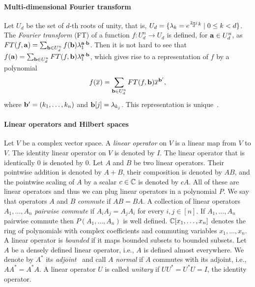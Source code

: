\paragraph{Multi-dimensional Fourier transform}\label{sec:multi-FT}

Let $U_d$ be the set of $d$-th roots of unity, that is,
$U_d=\{\lambda_k=e^{\frac{2\pi i}d k}\mid 0\le k<d\}$.
The \emph{Fourier transform} (FT) of a function $f:U_d^n\to U_d$ is defined, for 
${\bf a}\in U_d^n$, as
$
FT(f,{\bf a})=\sum_{{\bf b}\in U_d^n}f({\bf b})\lambda_1^{{\bf a}\cdot{\bf b}}$.
Then it is not hard to see that 
$
f({\bf a})=\sum_{{\bf b}\in U_d^n}FT(f,{\bf b})\lambda_1^{{\bf a}\cdot{\bf b}}$,
which gives rise to a representation of $f$ by a polynomial
\[
f(\overline x)=\sum_{{\bf b}\in U_d^n}FT(f,{\bf b})\overline x^{{\bf b}'},
\]
where ${\bf b}'=(k _1,\ldots, k _{n})$ and ${\bf b}[j]=\lambda_{k_j}$. This representation is
unique~\cite{ODonnell14:book}.

\paragraph{Linear operators and Hilbert spaces}
%
Let $V$ be a complex vector space. A \emph{linear operator} on $V$ is a linear
map from $V$ to $V$. The identity linear operator on $V$ is denoted by $I$. The
linear operator that is identically $0$ is denoted by $0$. 
%
Let $A$ and $B$ be two linear operators. Their pointwise addition is denoted by $A+B$, their
composition is denoted by $AB$, and the pointwise scaling of $A$ by a scalar
$c\in{\mathbb C}$ is denoted by $cA$. All of these are linear operators and thus we can
plug linear operators in a polynomial $P$. 
%
We say that operators $A$ and $B$ \emph{commute} if
$AB=BA$. A collection of linear operators $A_1,\ldots,A_n$ \emph{pairwise commute} if $A_iA_j=A_jA_i$ for every $i,j\in [n]$. 
%
If $A_1,\ldots,A_n$ pairwise commute then $P(A_1,\ldots,A_n)$ is well defined.
%
${\mathbb C}[x_1,\ldots,x_n]$ denotes the ring of polynomials with complex coefficients and commuting variables $x_1,\ldots,x_n$. 
%
A linear operator is \emph{bounded} if it maps bounded subsets to bounded
subsets. Let $A$ be a densely defined linear operator, i.e., $A$ is defined
almost everywhere. We denote by $A^*$ its \emph{adjoint}~\cite{Folland94}
and call $A$ \emph{normal} if $A$ commutes with its adjoint, i.e., $AA^*=A^*A$.
A linear operator $U$ is called \emph{unitary} if $UU^*=U^*U=I$, the identity
operator.

